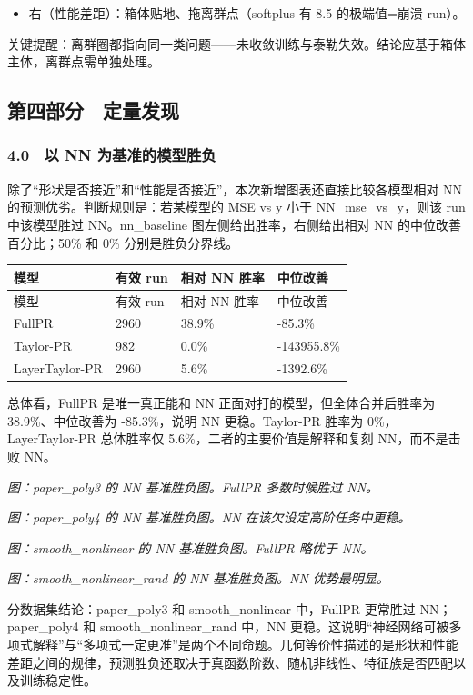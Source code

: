 \documentclass[UTF8,a4paper,11pt]{ctexart}
\begin{document}
\begin{itemize}
\item 右（性能差距）：箱体贴地、拖离群点（softplus 有 8.5 的极端值=崩溃 run）。
\end{itemize}

关键提醒：离群圈都指向同一类问题------未收敛训练与泰勒失效。结论应基于箱体主体，离群点需单独处理。

\subsection{第四部分　定量发现}

\subsubsection{4.0　以 NN 为基准的模型胜负}

除了“形状是否接近”和“性能是否接近”，本次新增图表还直接比较各模型相对 NN 的预测优劣。判断规则是：若某模型的 MSE vs y 小于 NN\_mse\_vs\_y，则该 run 中该模型胜过 NN。nn\_baseline 图左侧给出胜率，右侧给出相对 NN 的中位改善百分比；50\% 和 0\% 分别是胜负分界线。

\begin{longtable}{p{}p{}p{}p{}}
\toprule
模型 & 有效 run & 相对 NN 胜率 & 中位改善 \\
\midrule
\endfirsthead
\toprule
模型 & 有效 run & 相对 NN 胜率 & 中位改善 \\
\midrule
\endhead
FullPR & 2960 & 38.9\% & -85.3\% \\
Taylor-PR & 982 & 0.0\% & -143955.8\% \\
LayerTaylor-PR & 2960 & 5.6\% & -1392.6\% \\
\bottomrule
\end{longtable}

总体看，FullPR 是唯一真正能和 NN 正面对打的模型，但全体合并后胜率为 38.9\%、中位改善为 -85.3\%，说明 NN 更稳。Taylor-PR 胜率为 0\%，LayerTaylor-PR 总体胜率仅 5.6\%，二者的主要价值是解释和复刻 NN，而不是击败 NN。

\emph{图：paper\_poly3 的 NN 基准胜负图。FullPR 多数时候胜过 NN。}

\emph{图：paper\_poly4 的 NN 基准胜负图。NN 在该欠设定高阶任务中更稳。}

\emph{图：smooth\_nonlinear 的 NN 基准胜负图。FullPR 略优于 NN。}

\emph{图：smooth\_nonlinear\_rand 的 NN 基准胜负图。NN 优势最明显。}

分数据集结论：paper\_poly3 和 smooth\_nonlinear 中，FullPR 更常胜过 NN；paper\_poly4 和 smooth\_nonlinear\_rand 中，NN 更稳。这说明“神经网络可被多项式解释”与“多项式一定更准”是两个不同命题。几何等价性描述的是形状和性能差距之间的规律，预测胜负还取决于真函数阶数、随机非线性、特征族是否匹配以及训练稳定性。
\end{document}
